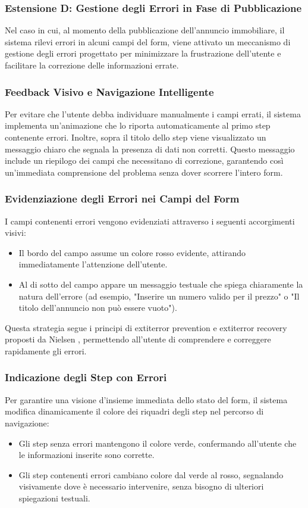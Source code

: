 \clearpage
\newpage
\subsubsection{Estensione D: Gestione degli Errori in Fase di Pubblicazione}

Nel caso in cui, al momento della pubblicazione dell'annuncio immobiliare, il sistema rilevi errori in alcuni campi del form, viene attivato un meccanismo di gestione degli errori progettato per minimizzare la frustrazione dell’utente e facilitare la correzione delle informazioni errate.

\subsubsection{Feedback Visivo e Navigazione Intelligente}
Per evitare che l’utente debba individuare manualmente i campi errati, il sistema implementa un’animazione che lo riporta automaticamente al primo step contenente errori. Inoltre, sopra il titolo dello step viene visualizzato un messaggio chiaro che segnala la presenza di dati non corretti. Questo messaggio include un riepilogo dei campi che necessitano di correzione, garantendo così un'immediata comprensione del problema senza dover scorrere l’intero form.

\subsubsection{Evidenziazione degli Errori nei Campi del Form}
I campi contenenti errori vengono evidenziati attraverso i seguenti accorgimenti visivi:
\begin{itemize}
    \item Il bordo del campo assume un colore rosso evidente, attirando immediatamente l’attenzione dell’utente.
    \item Al di sotto del campo appare un messaggio testuale che spiega chiaramente la natura dell’errore (ad esempio, "Inserire un numero valido per il prezzo" o "Il titolo dell’annuncio non può essere vuoto").
\end{itemize}

Questa strategia segue i principi di 	extit{error prevention} e 	extit{error recovery} proposti da Nielsen \cite{nielsen1995}, permettendo all’utente di comprendere e correggere rapidamente gli errori.

\subsubsection{Indicazione degli Step con Errori}
Per garantire una visione d'insieme immediata dello stato del form, il sistema modifica dinamicamente il colore dei riquadri degli step nel percorso di navigazione:
\begin{itemize}
    \item Gli step senza errori mantengono il colore verde, confermando all’utente che le informazioni inserite sono corrette.
    \item Gli step contenenti errori cambiano colore dal verde al rosso, segnalando visivamente dove è necessario intervenire, senza bisogno di ulteriori spiegazioni testuali.
\end{itemize}

